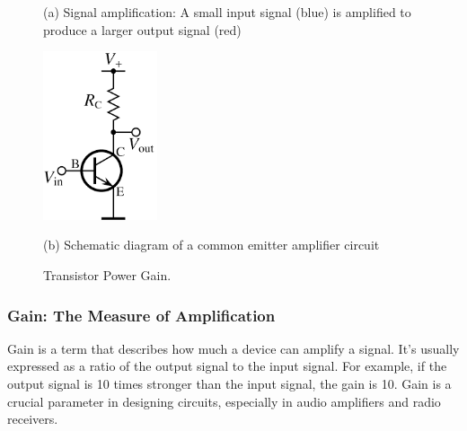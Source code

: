 \begin{figure}[h!]
    \centering
    \begin{minipage}{0.45\textwidth}
        \caption*{(a) Signal amplification: A small input signal (blue) is amplified to produce a larger output signal (red)}
    \end{minipage}%
    \hfill%
    \begin{minipage}{0.4\textwidth}
        \includegraphics[width=0.3\textwidth]{tech/images/transistor-amplifier.png}
        \caption*{(b) Schematic diagram of a common emitter amplifier circuit}
    \end{minipage}
    \caption{Transistor Power Gain. }
    \label{fig:transistor_power_gain}
\end{figure}

\subsubsection*{Gain: The Measure of Amplification}
Gain is a term that describes how much a device can amplify a signal. It’s usually expressed as a ratio of the output signal to the input signal. For example, if the output signal is 10 times stronger than the input signal, the gain is 10. Gain is a crucial parameter in designing circuits, especially in audio amplifiers and radio receivers.

